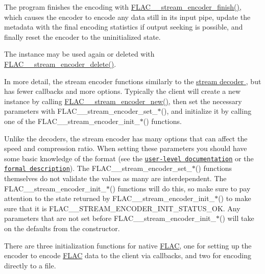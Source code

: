\begin{DoxyItemize}
\item The program finishes the encoding with \hyperlink{group__flac__stream__encoder_gab2c1e5477c1e3fe9ad0d722ff8eecda2}{F\+L\+A\+C\+\_\+\+\_\+stream\+\_\+encoder\+\_\+finish()}, which causes the encoder to encode any data still in its input pipe, update the metadata with the final encoding statistics if output seeking is possible, and finally reset the encoder to the uninitialized state.
\item The instance may be used again or deleted with \hyperlink{group__flac__stream__encoder_ga9c9956af42bebe923da59437628aa9ea}{F\+L\+A\+C\+\_\+\+\_\+stream\+\_\+encoder\+\_\+delete()}.
\end{DoxyItemize}

In more detail, the stream encoder functions similarly to the \hyperlink{group__flac__stream__decoder}{stream decoder }, but has fewer callbacks and more options. Typically the client will create a new instance by calling \hyperlink{group__flac__stream__encoder_ga35f3d94452bcf0a90a31c7d770b200bc}{F\+L\+A\+C\+\_\+\+\_\+stream\+\_\+encoder\+\_\+new()}, then set the necessary parameters with F\+L\+A\+C\+\_\+\+\_\+stream\+\_\+encoder\+\_\+set\+\_\+$\ast$(), and initialize it by calling one of the F\+L\+A\+C\+\_\+\+\_\+stream\+\_\+encoder\+\_\+init\+\_\+$\ast$() functions.

Unlike the decoders, the stream encoder has many options that can affect the speed and compression ratio. When setting these parameters you should have some basic knowledge of the format (see the \href{../documentation_format_overview.html}{\tt user-\/level documentation} or the \href{../format.html}{\tt formal description}). The F\+L\+A\+C\+\_\+\+\_\+stream\+\_\+encoder\+\_\+set\+\_\+$\ast$() functions themselves do not validate the values as many are interdependent. The F\+L\+A\+C\+\_\+\+\_\+stream\+\_\+encoder\+\_\+init\+\_\+$\ast$() functions will do this, so make sure to pay attention to the state returned by F\+L\+A\+C\+\_\+\+\_\+stream\+\_\+encoder\+\_\+init\+\_\+$\ast$() to make sure that it is F\+L\+A\+C\+\_\+\+\_\+\+S\+T\+R\+E\+A\+M\+\_\+\+E\+N\+C\+O\+D\+E\+R\+\_\+\+I\+N\+I\+T\+\_\+\+S\+T\+A\+T\+U\+S\+\_\+\+OK. Any parameters that are not set before F\+L\+A\+C\+\_\+\+\_\+stream\+\_\+encoder\+\_\+init\+\_\+$\ast$() will take on the defaults from the constructor.

There are three initialization functions for native \hyperlink{namespace_f_l_a_c}{F\+L\+AC}, one for setting up the encoder to encode \hyperlink{namespace_f_l_a_c}{F\+L\+AC} data to the client via callbacks, and two for encoding directly to a file.

